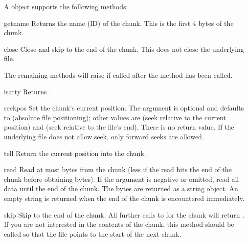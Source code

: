 A  object supports the following methods:

\begin{methoddesc}{getname}{}
Returns the name (ID) of the chunk.  This is the first 4 bytes of the
chunk.
\end{methoddesc}

\begin{methoddesc}{close}{}
Close and skip to the end of the chunk.  This does not close the
underlying file.
\end{methoddesc}

The remaining methods will raise  if called after
the  method has been called.

\begin{methoddesc}{isatty}{}
Returns .
\end{methoddesc}

\begin{methoddesc}{seek}{pos}
Set the chunk's current position.  The  argument is
optional and defaults to  (absolute file positioning); other
values are  (seek relative to the current position) and
 (seek relative to the file's end).  There is no return value.
If the underlying file does not allow seek, only forward seeks are
allowed.
\end{methoddesc}

\begin{methoddesc}{tell}{}
Return the current position into the chunk.
\end{methoddesc}

\begin{methoddesc}{read}{}
Read at most  bytes from the chunk (less if the read hits
the end of the chunk before obtaining  bytes).  If the
 argument is negative or omitted, read all data until the
end of the chunk.  The bytes are returned as a string object.  An
empty string is returned when the end of the chunk is encountered
immediately.
\end{methoddesc}

\begin{methoddesc}{skip}{}
Skip to the end of the chunk.  All further calls to 
for the chunk will return .  If you are not interested in the
contents of the chunk, this method should be called so that the file
points to the start of the next chunk.
\end{methoddesc}
